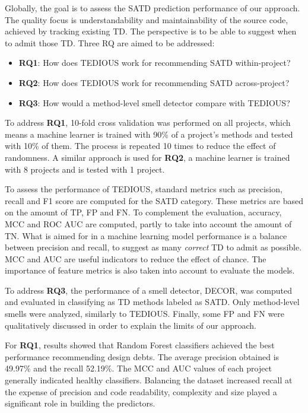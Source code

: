 Globally, the goal is to assess the \ac{SATD} prediction performance of our approach. The quality focus is understandability and maintainability of the source code, achieved by tracking existing \ac{TD}. The perspective is to be able to suggest when to admit those \ac{TD}. Three \ac{RQ} are aimed to be addressed: 

\begin{itemize}
	\item \textbf{RQ1}: How does \ac{TEDIOUS} work for recommending \ac{SATD} within-project?
	\item \textbf{RQ2}: How does \ac{TEDIOUS} work for recommending \ac{SATD} across-project?
	\item \textbf{RQ3}: How would a method-level smell detector compare with \ac{TEDIOUS}?
\end{itemize}

To address \textbf{RQ1}, 10-fold cross validation was performed on all projects, which means a machine learner is trained with 90\% of a project's methods and tested with 10\% of them. The process is repeated 10 times to reduce the effect of randomness. A similar approach is used for \textbf{RQ2}, a machine learner is trained with 8 projects and is tested with 1 project. \par

To assess the performance of \ac{TEDIOUS}, standard metrics such as precision, recall and F1 score are computed for the \ac{SATD} category. These metrics are based on the amount of \ac{TP}, \ac{FP} and \ac{FN}. To complement the evaluation, accuracy, \ac{MCC} and \ac{ROC} \ac{AUC} are computed, partly to take into account the amount of \ac{TN}. What is aimed for in a machine learning model performance is a balance between precision and recall, to suggest as many \emph{correct} \ac{TD} to admit as possible. \ac{MCC} and \ac{AUC} are useful indicators to reduce the effect of chance. The importance of feature metrics is also taken into account to evaluate the models. \par

To address \textbf{RQ3}, the performance of a smell detector, \ac{DECOR}, was computed and evaluated in classifying as \ac{TD} methods labeled as \ac{SATD}. Only method-level smells were analyzed, similarly to \ac{TEDIOUS}. Finally, some \ac{FP} and \ac{FN} were qualitatively discussed in order to explain the limits of our approach. \par

For \textbf{RQ1}, results showed that Random Forest classifiers achieved the best performance recommending design debts. The average precision obtained is 49.97\% and the recall 52.19\%. The MCC and AUC values of each project generally indicated healthy classifiers. Balancing the dataset increased recall at the expense of precision and code readability, complexity and size played a significant role in building the predictors. \par

